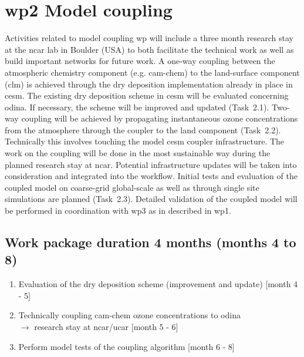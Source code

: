 \section{\gls{wp}2 Model coupling}
\label{sec:wp2}
Activities related to model coupling \gls{wp} will include a three month research stay at the \gls{ncar} lab in Boulder (USA) to both facilitate the technical work as well as build important networks for future work. A one-way coupling between the atmospheric chemistry component (e.g. \gls{cam}-chem) to the land-surface component (\gls{clm}) is achieved through the dry deposition implementation already in place in \gls{cesm}. The existing dry deposition scheme in \gls{cesm} will be evaluated concerning \gls{odina}. If necessary, the scheme will be improved and updated (Task~2.1). Two-way coupling will be achieved by propagating instantaneous ozone concentrations from the atmosphere through the coupler to the land component (Task~2.2). Technically this involves touching the model \gls{cesm} coupler infrastructure. The work on the coupling will be done in the most sustainable way during the planned research stay at \gls{ncar}. Potential infrastructure updates will be taken into consideration and integrated into the workflow. Initial tests and evaluation of the coupled model on coarse-grid global-scale as well as through  single site simulations are planned (Task~2.3). Detailed validation of the coupled model will be performed in coordination with \gls{wp}3 as in described in \gls{wp}1.

\subsection*{Work package duration 4 months (months 4 to 8)}
\begin{enumerate}[start=1,label={T2.\arabic*}]
  \itemsep0pt
\item Evaluation of the dry deposition scheme (improvement and update) \hfill [month 4 - 5]
\item Technically coupling \gls{cam}-chem ozone concentrations to \gls{odina} \\$\rightarrow$ research stay at \gls{ncar}/\gls{ucar} \hfill [month 5 - 6]
\item Perform model  tests of the coupling algorithm \hfill [month 6 - 8]
\end{enumerate}

